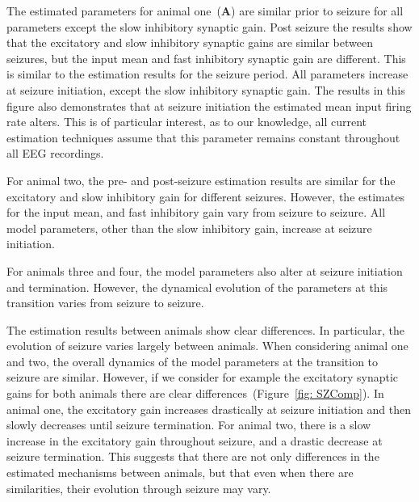 The estimated parameters for animal one~(\textbf{A}) are similar prior to seizure for all parameters except the slow inhibitory synaptic gain. Post seizure the results show that the excitatory and slow inhibitory synaptic gains are similar between seizures, but the input mean and fast inhibitory synaptic gain are different. This is similar to the estimation results for the seizure period. All parameters increase at seizure initiation, except the slow inhibitory synaptic gain. The results in this figure also demonstrates that at seizure initiation the estimated mean input firing rate alters. This is of particular interest, as to our knowledge, all current estimation techniques assume that this parameter remains constant throughout all EEG recordings. 

For animal two, the pre- and post-seizure estimation results are similar for the excitatory and slow inhibitory gain for different seizures. However, the estimates for the input mean, and fast inhibitory gain vary from seizure to seizure. All model parameters, other than the slow inhibitory gain, increase at seizure initiation.  

For animals three and four, the model parameters also alter at seizure initiation and termination. However, the dynamical evolution of the parameters at this transition varies from seizure to seizure.

The estimation results between animals show clear differences. In particular, the evolution of seizure varies largely between animals. When considering animal one and two, the overall dynamics of the model parameters at the transition to seizure are similar. However, if we consider for example the excitatory synaptic gains for both animals there are clear differences~(Figure~\ref{fig: SZComp}). In animal one, the excitatory gain increases drastically at seizure initiation and then slowly decreases until seizure termination. For animal two, there is a slow increase in the excitatory gain throughout seizure, and a drastic decrease at seizure termination. This suggests that there are not only differences in the estimated mechanisms between animals, but that even when there are similarities, their evolution through seizure may vary. 

